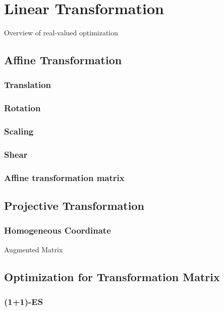 \chapter{Linear Transformation}
\label{c:transformation}

Overview of real-valued optimization

\section{Affine Transformation}

\subsection{Translation}
\subsection{Rotation}
\subsection{Scaling}
\subsection{Shear}
\subsection{Affine transformation matrix}

\section{Projective Transformation}

\subsection{Homogeneous Coordinate}
Augmented Matrix





\section{Optimization for Transformation Matrix}

\subsection{(1+1)-ES}

